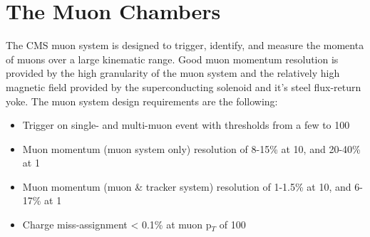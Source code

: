 \section{The Muon Chambers}
The CMS muon system is designed to trigger, identify, and measure the
momenta of muons over a large kinematic range. Good muon momentum
resolution is provided by the high granularity of the muon system and
the relatively high magnetic field provided by the superconducting
solenoid and it's steel flux-return yoke. The muon system design
requirements are the following:
\begin{itemize}
\item Trigger on single- and multi-muon event with thresholds from a
  few to 100\GeV
\item Muon momentum (muon system only) resolution of 8-15\% at 10\GeV,
  and 20-40\% at 1\TeV
\item Muon momentum (muon \& tracker system) resolution of 1-1.5\% at
  10\GeV, and 6-17\% at 1\TeV
\item Charge miss-assignment < 0.1\% at muon p$_{T}$ of 100\GeV
\end{itemize}

